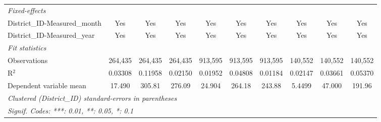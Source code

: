 \begin{tabular}{lccccccccc}
   \midrule
   \emph{Fixed-effects}\\
   District\_ID-Measured\_month   & Yes                     & Yes                       & Yes                   & Yes                     & Yes                       & Yes                   & Yes                   & Yes                     & Yes\\  
   District\_ID-Measured\_year    & Yes                     & Yes                       & Yes                   & Yes                     & Yes                       & Yes                   & Yes                   & Yes                     & Yes\\  
   \midrule
   \emph{Fit statistics}\\
   Observations                   & 264,435                 & 264,435                   & 264,435               & 913,595                 & 913,595                   & 913,595               & 140,552               & 140,552                 & 140,552\\  
   R$^2$                          & 0.03308                 & 0.11958                   & 0.02150               & 0.01952                 & 0.04808                   & 0.01184               & 0.02147               & 0.03661                 & 0.05370\\  
   Dependent variable mean        & 17.490                  & 305.81                    & 276.09                & 24.904                  & 264.18                    & 243.88                & 5.4499                & 47.000                  & 191.96\\  
   \midrule \midrule
   \multicolumn{10}{l}{\emph{Clustered (District\_ID) standard-errors in parentheses}}\\
   \multicolumn{10}{l}{\emph{Signif. Codes: ***: 0.01, **: 0.05, *: 0.1}}\\
\end{tabular}
\par\endgroup
